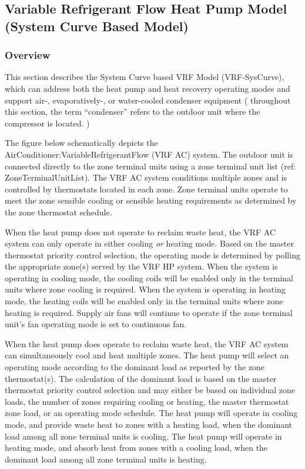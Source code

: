 \subsection{Variable Refrigerant Flow Heat Pump Model (System Curve Based Model)}\label{variable-refrigerant-flow-heat-pump-model-system-curve-based-model}

\subsubsection{Overview}\label{overview-028}

This section describes the System Curve based VRF Model (VRF-SysCurve), which can address both the heat pump and heat recovery operating modes and support air-, evaporatively-, or water-cooled condenser equipment ( throughout this section, the term ``condenser'' refers to the outdoor unit where the compressor is located. )

The figure below schematically depicts the AirConditioner:VariableRefrigerantFlow (VRF AC) system. The outdoor unit is connected directly to the zone terminal units using a zone terminal unit list (ref: ZoneTerminalUnitList). The VRF AC system conditions multiple zones and is controlled by thermostats located in each zone. Zone terminal units operate to meet the zone sensible cooling or sensible heating requirements as determined by the zone thermostat schedule.

When the heat pump does not operate to reclaim waste heat, the VRF AC system can only operate in either cooling \emph{or} heating mode. Based on the master thermostat priority control selection, the operating mode is determined by polling the appropriate zone(s) served by the VRF HP system. When the system is operating in cooling mode, the cooling coils will be enabled only in the terminal units where zone cooling is required. When the system is operating in heating mode, the heating coils will be enabled only in the terminal units where zone heating is required. Supply air fans will continue to operate if the zone terminal unit's fan operating mode is set to continuous fan.

When the heat pump does operate to reclaim waste heat, the VRF AC system can simultaneously cool and heat multiple zones. The heat pump will select an operating mode according to the dominant load as reported by the zone thermostat(s). The calculation of the dominant load is based on the master thermostat priority control selection and may either be based on individual zone loads, the number of zones requiring cooling or heating, the master thermostat zone load, or an operating mode schedule. The heat pump will operate in cooling mode, and provide waste heat to zones with a heating load, when the dominant load among all zone terminal units is cooling. The heat pump will operate in heating mode, and absorb heat from zones with a cooling load, when the dominant load among all zone terminal units is heating.

